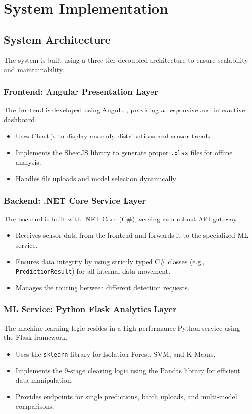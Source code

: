 \chapter{System Implementation}

\section{System Architecture}
The system is built using a three-tier decoupled architecture to ensure scalability and maintainability.

\subsection{Frontend: Angular Presentation Layer}
The frontend is developed using Angular, providing a responsive and interactive dashboard. 
\begin{itemize}
    \item Uses Chart.js to display anomaly distributions and sensor trends.
    \item Implements the SheetJS library to generate proper \texttt{.xlsx} files for offline analysis.
    \item Handles file uploads and model selection dynamically.
\end{itemize}

\subsection{Backend: .NET Core Service Layer}
The backend is built with .NET Core (C\#), serving as a robust API gateway.
\begin{itemize}
    \item Receives sensor data from the frontend and forwards it to the specialized ML service.
    \item Ensures data integrity by using strictly typed C\# classes (e.g., \texttt{PredictionResult}) for all internal data movement.
    \item Manages the routing between different detection requests.
\end{itemize}

\subsection{ML Service: Python Flask Analytics Layer}
The machine learning logic resides in a high-performance Python service using the Flask framework.
\begin{itemize}
    \item Uses the \texttt{sklearn} library for Isolation Forest, SVM, and K-Means.
    \item Implements the 9-stage cleaning logic using the Pandas library for efficient data manipulation.
    \item Provides endpoints for single predictions, batch uploads, and multi-model comparisons.
\end{itemize}

